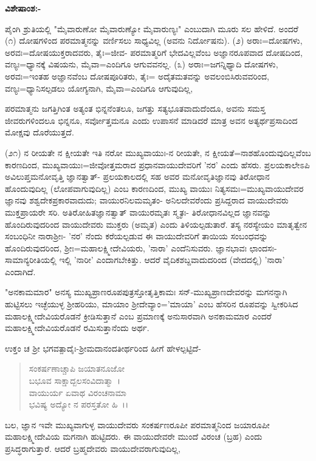 \noindent
\textbf{ವಿಶೇಷಾಂಶ:-}

ಪೈಂಗಿ ಶ್ರುತಿಯಲ್ಲಿ "ಮೈವಾರುಣೋ ಮೈವಾರುಣ್ಯೋ ಮೈವಾರುಣ್ಯಃ" ಎಂಬುದಾಗಿ ಮೂರು ಸಲ ಹೇಳಿದೆ. ಅಂದರೆ (೧) ದೋಷಗಳಿಂದ ಪರಮಾತ್ಮನನ್ನು ವರ್ಣಿಸಲು ಸಾಧ್ಯವಿಲ್ಲ (ಅವನು ನಿರ್ದೋಷನು). (೨) ಅರಾಃ=ದೋಷಗಳು, ಅರವಃ=ದೋಷಯುಕ್ತರಾದವರು, ತೈಃ=ಜೀವ- ಪರಮಾತ್ಮರಿಗೆ ಭೇದವಿಲ್ಲವೆಂಬ ಅಜ್ಞಾನರೂಪವಾದ ದೋಷದಿಂದ, ವಣ್ಯಃ=ಧ್ಯಾನಕ್ಕೆ ವಿಷಯನು, ಮೈವಾ=ಎಂದಿಗೂ ಆಗುವವನಲ್ಲ. (೩) ಅರಾಃ=ಜಗನ್ನಿಥ್ಯಾದಿ ದೋಷಗಳು, ಅರವಃ=ಇಂತಹ ಅಜ್ಞಾನವೆಂಬ ದೋಷಪೂರಿತರು, ತೈಃ= ಅದೈತಮತವನ್ನು ಅವಲಂಬಿಸಿರುವವರಿಂದ, ವಣ್ಯಃ=ಧ್ಯಾನಿಸಲ್ಪಡಲು ಯೋಗ್ಯನಾಗಿ, ಮೈವಾ=ಎಂದಿಗೂ ಆಗುವುದಿಲ್ಲ,

ಪರಮಾತ್ಮನು ಜಗತ್ತಿಗಿಂತ ಅತ್ಯಂತ ಭಿನ್ನನೆಂತಲೂ, ಜಗತ್ತು ಸತ್ಯಭೂತವಾದುದೆಂದೂ, ಅವನು ಸಮಸ್ತ ಜೀವರುಗಳಿಂದಲೂ ಭಿನ್ನನೂ, ಸರ್ವೋತ್ತಮನೂ ಎಂದು ಉಪಾಸನೆ ಮಾಡಿದರೆ ಮಾತ್ರ ಅವನ ಅತ್ಯರ್ಥಪ್ರಸಾದಿಂದ ಮೋಕ್ಷವು ದೊರೆಯುತ್ತದೆ.

(೨೧) ನ ರೀಯತೇ ನ ಕ್ಷೀಯತೇ ಇತಿ ನರೋ ಮುಖ್ಯವಾಯುಃ-ನ ರೀಯತೇ, ನ ಕ್ಷೀಯತೆ=ನಾಶಹೊಂದುವುದಿಲ್ಲವೆಂಬ ಕಾರಣದಿಂದ, ಮುಖ್ಯವಾಯುಃ=ಜೀವೋತ್ತಮರಾದ ಪ್ರಧಾನವಾಯುದೇವರಿಗೆ 'ನರ' ಎಂದು ಹೆಸರು. ಪ್ರಲಯಕಾಲೇಽಪಿ ಅವಿಲುಪ್ತಮನೋವೃತ್ತಿ ಜ್ಞಾನತ್ವಾತ್- ಪ್ರಲಯಕಾಲದಲ್ಲಿ ಸಹ ಅವರ ಮನೋವೃತಿಜ್ಞಾನವು ತಿರೋಧಾನ ಹೊಂದುವುದಿಲ್ಲ (ಲೋಪವಾಗುವುದಿಲ್ಲ) ಎಂಬ ಕಾರಣದಿಂದ, ಮುಖ್ಯ ವಾಯುಃ ನಿತ್ಯಸಮಃ=ಮುಖ್ಯವಾಯುದೇವರ ಜ್ಞಾನವು ಶಶ್ವದೇಕಪ್ರಕಾರವಾದುದು; ವಾಯುರನಿಲಮಮೃತಂ- ಅನಿಲದೇವರೆಂದು ಪ್ರಸಿದ್ದರಾದ ವಾಯುದೇವರು ಮುಕ್ತಪ್ರಾಯರೇ ಸರಿ. ಅತಿರೋಹಿತಜ್ಞಾನತ್ವಾತ್ ವಾಯುರಮೃತಃ ಸ್ಮೃತಃ- ತಿರೋಧಾನವಿಲ್ಲದ ಜ್ಞಾನವನ್ನು ಹೊಂದಿರುವುದರಿಂದ ವಾಯುದೇವರು ಮುಕ್ತರು (ಅಮೃತ) ಎಂದು ತಿಳಿಯಲ್ಪಡುತಾರೆ. ತಸ್ಯ ನರಸ್ಯೇಯಂ ಮಾತೃತ್ವೇನ ಸಂಬಂಧಿನೀ ನಾರಾಶ‍್ರೀಃ- 'ನರ' ನೆಂದು ಕರೆಯಲ್ಪಡುವ ಈ ವಾಯುದೇವರಿಗೆ ತಾಯಿಯ ಸಂಬಂಧವನ್ನು ಹೊಂದಿರುವುದರಿಂದ, ಶ‍್ರೀಃ=ಮಹಾಲಕ್ಷ್ಮೀದೇವಿಯರು, 'ನಾರಾ' ಎಂದೆನಿಸುವರು. ಜ್ಞಾನಭಾವಃ ಛಾಂದಸಃ-ಸಾಮಾನ್ಯರೀತಿಯಲ್ಲಿ ಇಲ್ಲಿ 'ನಾರೀ' ಎಂದಾಗಬೇಕಿತ್ತು. ಆದರೆ ವೈದಿಕಶಬ್ದವಾದುದರಿಂದ (ವೇದದಲ್ಲಿ) 'ನಾರಾ' ಎಂದಾಗಿದೆ.

"ಅನಕಾಮಮಾರ" ಅನಸ್ಯ ಮುಖ್ಯಪ್ರಾಣರೂಪಪುತ್ರಸ್ತೋತೃತ್ತಿಕಾಮಃ ಸನ್-ಮುಖ್ಯಪ್ರಾಣದೇವರನ್ನು ಮಗನನ್ನಾಗಿ ಹುಟ್ಟಿಸಲು ಇಚ್ಛೆಯುಳ್ಳ ಶ‍್ರೀಹರಿಯು, ಮಾಯಾಂ ಶ‍್ರೀದೇವ್ಯಾಂ='ಮಾಯಾ' ಎಂಬ ಹೆಸರಿನ ರೂಪವನ್ನು ಸ್ವೀಕರಿಸಿದ ಮಹಾಲಕ್ಷ್ಮೀದೇವಿಯರೊಡನೆ ಕ್ರೀಡಿಸುತ್ತಾನೆ ಎಂಬ ಪ್ರಮಾಣಕ್ಕೆ ಅನುಸಾರವಾಗಿ ಅನಕಾಮಮಾರ ಎಂದರೆ ಮಹಾಲಕ್ಷ್ಮೀದೇವಿಯರೊಡನೆ ರಮಿಸುತ್ತಾನೆಂದು ಅರ್ಥ.

ಉಕ್ತಂ ಚ ಶ‍್ರೀ ಭಗವತ್ಪಾದೈಃ-ಶ‍್ರೀಮದಾನಂದತೀರ್ಥರಿಂದ ಹೀಗೆ ಹೇಳಲ್ಪಟ್ಟಿದೆ-

\begin{verse}
ಸಂಕರ್ಷಣಾಚ್ಚಾಪಿ ಜಯಾತನೂಜೋ\\ ಬಭೂವ ಸಾಕ್ಷಾದ್ಬಲಸಂವಿದಾತ್ಮಾ~।\\ ವಾಯುರ್ಯ ಏವಾಥ ವಿರಂಚನಾಮಾ\\ ಭವಿಷ್ಯ ಅದ್ಯೋ ನ ಪರಸ್ತತೋ ಹಿ~।।
\end{verse}

\noindent
ಬಲ, ಜ್ಞಾನ ಇವೇ ಮುಖ್ಯವಾಗುಳ್ಳ ವಾಯುದೇವರು ಸಂಕರ್ಷಣರೂಪೀ ಪರಮಾತ್ಮನಿಂದ ಜಯಾರೂಪೀ ಮಹಾಲಕ್ಷ್ಮೀದೇವಿಯ ಮಗನಾಗಿ ಹುಟ್ಟಿದರು. ಈ ವಾಯುದೇವರೇ ಮುಂದೆ ವಿರಂಚ (ಬ್ರಹ) ಎಂದು ಪ್ರಸಿದ್ಧರಾಗುತ್ತಾರೆ. ಆದರೆ ಬ್ರಹ್ಮದೇವರು ವಾಯುದೇವರಾಗುವುದಿಲ್ಲ,

